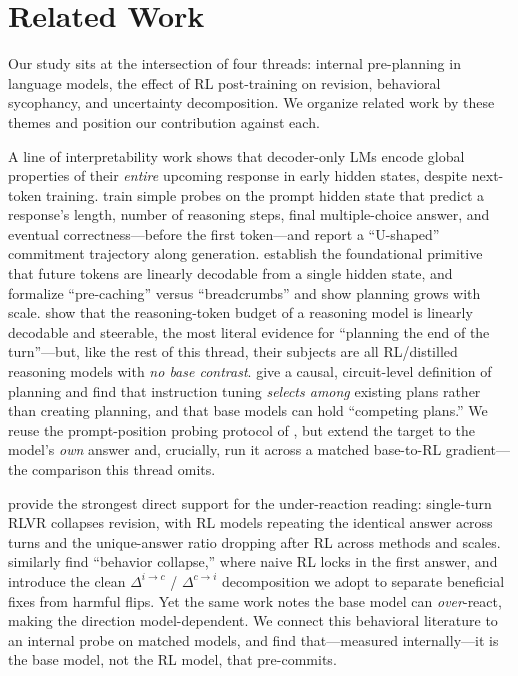 \section{Related Work}
\label{sec:related}

Our study sits at the intersection of four threads: internal pre-planning in language models,
the effect of RL post-training on revision, behavioral sycophancy, and uncertainty
decomposition. We organize related work by these themes and position our contribution against
each.

 A line of interpretability work shows that
decoder-only LMs encode global properties of their \emph{entire} upcoming response in early
hidden states, despite next-token training. \citet{dong2025emergent} train simple probes on
the prompt hidden state that predict a response's length, number of reasoning steps, final
multiple-choice answer, and eventual correctness---before the first token---and report a
``U-shaped'' commitment trajectory along generation. \citet{pal2023future} establish the
foundational primitive that future tokens are linearly decodable from a single hidden state,
and \citet{wu2024plan} formalize ``pre-caching'' versus ``breadcrumbs'' and show planning
grows with scale. \citet{reasoningstrength2025} show that the reasoning-token budget of a
reasoning model is linearly decodable and steerable, the most literal evidence for
``planning the end of the turn''---but, like the rest of this thread, their subjects are all
RL/distilled reasoning models with \emph{no base contrast}. \citet{bigelow2025planning} give
a causal, circuit-level definition of planning and find that instruction tuning \emph{selects
among} existing plans rather than creating planning, and that base models can hold
``competing plans.'' We reuse the prompt-position probing protocol of
\citet{dong2025emergent}, but extend the target to the model's \emph{own} answer and, crucially,
run it across a matched base-to-RL gradient---the comparison this thread omits.

 \citet{ufo2025} provide the strongest
direct support for the under-reaction reading: single-turn RLVR collapses revision, with RL
models repeating the identical answer across turns and the unique-answer ratio dropping after
RL across methods and scales. \citet{kumar2024score} similarly find ``behavior collapse,''
where naive RL locks in the first answer, and introduce the clean $\Delta^{i\rightarrow c}$ /
$\Delta^{c\rightarrow i}$ decomposition we adopt to separate beneficial fixes from harmful
flips. Yet the same work notes the base model can \emph{over}-react, making the direction
model-dependent. We connect this behavioral literature to an internal probe on matched models,
and find that---measured internally---it is the base model, not the RL model, that
pre-commits.

